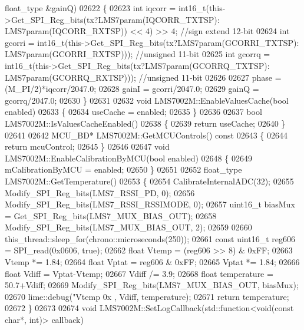 \begin{DoxyCode}
{{{{{{{{{{{{{{{{{{{{{{{{{{{{{{{{{{{{{{{{{{{{{{{{{{{{{{{{{{{{{{{{      float_type &gainQ)
02622 \{
02623     \textcolor{keywordtype}{int} iqcorr = int16\_t(this->Get_SPI_Reg_bits(tx?LMS7param(IQCORR_TXTSP):
      LMS7param(IQCORR_RXTSP)) << 4) >> 4; \textcolor{comment}{//sign extend 12-bit}
02624     \textcolor{keywordtype}{int} gcorri = int16\_t(this->Get_SPI_Reg_bits(tx?LMS7param(GCORRI_TXTSP):
      LMS7param(GCORRI_RXTSP))); \textcolor{comment}{//unsigned 11-bit}
02625     \textcolor{keywordtype}{int} gcorrq = int16\_t(this->Get_SPI_Reg_bits(tx?LMS7param(GCORRQ_TXTSP):
      LMS7param(GCORRQ_RXTSP))); \textcolor{comment}{//unsigned 11-bit}
02626 
02627     phase = (M\_PI/2)*iqcorr/2047.0;
02628     gainI = gcorri/2047.0;
02629     gainQ = gcorrq/2047.0;
02630 \}
02631 
02632 \textcolor{keywordtype}{void} LMS7002M::EnableValuesCache(\textcolor{keywordtype}{bool} enabled)
02633 \{
02634     useCache = enabled;
02635 \}
02636 
02637 \textcolor{keywordtype}{bool} LMS7002M::IsValuesCacheEnabled()
02638 \{
02639     \textcolor{keywordflow}{return} useCache;
02640 \}
02641 
02642 MCU_BD* LMS7002M::GetMCUControls()\textcolor{keyword}{ const}
02643 \textcolor{keyword}{}\{
02644     \textcolor{keywordflow}{return} mcuControl;
02645 \}
02646 
02647 \textcolor{keywordtype}{void} LMS7002M::EnableCalibrationByMCU(\textcolor{keywordtype}{bool} enabled)
02648 \{
02649     mCalibrationByMCU = enabled;
02650 \}
02651 
02652 float_type LMS7002M::GetTemperature()
02653 \{
02654     CalibrateInternalADC(32);
02655     Modify_SPI_Reg_bits(LMS7_RSSI_PD, 0);
02656     Modify_SPI_Reg_bits(LMS7_RSSI_RSSIMODE, 0);
02657     uint16\_t biasMux = Get_SPI_Reg_bits(LMS7_MUX_BIAS_OUT);
02658     Modify_SPI_Reg_bits(LMS7_MUX_BIAS_OUT, 2);
02659 
02660     this\_thread::sleep\_for(chrono::microseconds(250));
02661     \textcolor{keyword}{const} uint16\_t reg606 = SPI_read(0x0606, \textcolor{keyword}{true});
02662     \textcolor{keywordtype}{float} Vtemp = (reg606 >> 8) & 0xFF;
02663     Vtemp *= 1.84;
02664     \textcolor{keywordtype}{float} Vptat = reg606 & 0xFF;
02665     Vptat *= 1.84;
02666     \textcolor{keywordtype}{float} Vdiff = Vptat-Vtemp;
02667     Vdiff /= 3.9;
02668     \textcolor{keywordtype}{float} temperature = 50.7+Vdiff;
02669     Modify_SPI_Reg_bits(LMS7_MUX_BIAS_OUT, biasMux);
02670     lime::debug(\textcolor{stringliteral}{"Vtemp 0x%
      , Vdiff, temperature);
02671     \textcolor{keywordflow}{return} temperature;
02672 \}
02673 
02674 \textcolor{keywordtype}{void} LMS7002M::SetLogCallback(std::function<\textcolor{keywordtype}{void}(\textcolor{keyword}{const} \textcolor{keywordtype}{char}*, \textcolor{keywordtype}{int})> callback)
}}}}}}}}}}}}}}}}}}}}}}}}}}}}}}}}}}}}}}}}}}}}}}}}}}}}}}}}}}}}}}}}}
\end{DoxyCode}
